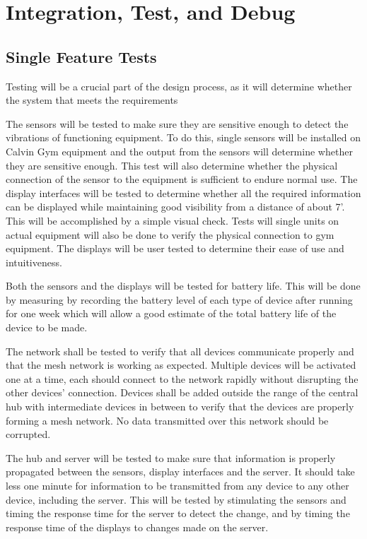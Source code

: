 \documentclass[PPFS.tex]{template/subfiles}
\begin{document}
\section{Integration, Test, and Debug}
\subsection{Single Feature Tests}

Testing will be a crucial part of the design process, as it will determine whether the system that meets the requirements 

The sensors will be tested to make sure they are sensitive enough to detect the vibrations of functioning equipment.  To do this, single sensors will be installed on Calvin Gym equipment and the output from the sensors will determine whether they are sensitive enough. This test will also determine whether the physical connection of the sensor to the equipment is sufficient to endure normal use.
The display interfaces will be tested to determine whether all the required information can be displayed while maintaining good visibility from a distance of about 7'. This will be accomplished by a simple visual check. Tests will single units on actual equipment will also be done to verify the physical connection to gym equipment. The displays will be user tested to determine their ease of use and intuitiveness.

Both the sensors and the displays will be tested for battery life. This will be done by measuring by recording the battery level of each type of device after running for one week which will allow a good estimate of the total battery life of the device to be made.

The network shall be tested to verify that all devices communicate properly and that the mesh network is working as expected. Multiple devices will be activated one at a time, each should connect to the network rapidly without disrupting the other devices’ connection. Devices shall be added outside the range of the central hub with intermediate devices in between to verify that the devices are properly forming a mesh network. No data transmitted over this network should be corrupted.

The hub and server will be tested to make sure that information is properly propagated between the sensors, display interfaces and the server. It should take less one minute for information to be transmitted from any device to any other device, including the server. This will be tested by stimulating the sensors and timing the response time for the server to detect the change, and by timing the response time of the displays to changes made on the server. 
\end{document}
